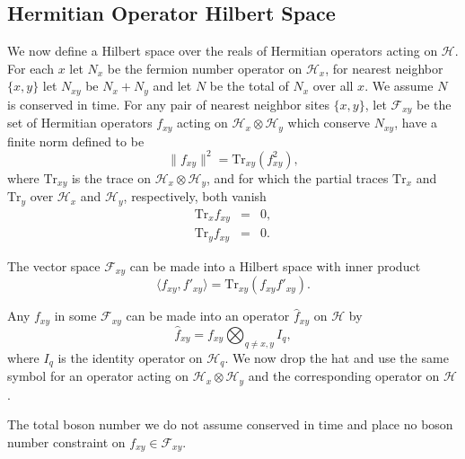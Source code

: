 \documentclass[twocolumn,amsmath,amssymb]{revtex4-1}
\begin{document}
\subsection{\label{subsec:operatorspace} Hermitian Operator Hilbert Space}

We now define a Hilbert space over the reals of Hermitian operators
acting on $\mathcal{H}$. 
For each $x$ let $N_x$ be the fermion number operator on $\mathcal{H}_x$,
for nearest neighbor $\{x, y\}$
let $N_{xy}$ be $N_x + N_y$ and 
let $N$ be the total of $N_x$ over all $x$. 
We assume $N$ is conserved in time.
For any pair of nearest neighbor sites $ \{x, y\}$, let
$\mathcal{F}_{x y}$ be the set of Hermitian operators
$f_{xy}$ acting on
$\mathcal{H}_x \otimes \mathcal{H}_y$  which
conserve $N_{xy}$, have a finite
norm defined to be
\begin{equation}
  \label{normf}
  \parallel f_{xy} \parallel ^ 2 = \mathrm{Tr}_{xy}( f_{xy}^2),
\end{equation}
where $\mathrm{Tr}_{xy}$ is the trace on $\mathcal{H}_x \otimes \mathcal{H}_y$,
and for which the partial traces $\mathrm{Tr}_x$ and $\mathrm{Tr}_y$ over $\mathcal{H}_x$
and $\mathcal{H}_y$, respectively, both vanish
\begin{subequations}
\begin{eqnarray}
  \label{trx}
  \mathrm{Tr}_x f_{xy} & = & 0, \\
  \label{try}
  \mathrm{Tr}_y f_{xy} & = & 0.
\end{eqnarray}
\end{subequations}

The vector space $\mathcal{F}_{x y}$ can be made into a Hilbert space
with inner product
\begin{equation}
  \label{ffprime}
   \langle  f_{xy}, f'_{xy} \rangle  = \mathrm{Tr}_{xy}( f_{xy} f'_{xy}).
\end{equation}

Any $f_{xy}$ in some $\mathcal{F}_{xy}$ can be made into an
operator $\hat{ f}_{xy}$ on $\mathcal{H}$ by
\begin{equation}
\label{defhf}
\hat{ f}_{xy} =  f_{xy} \bigotimes_{q \ne x,y} I_q, 
\end{equation}
where $I_q$ is the identity operator on $\mathcal{H}_q$.
We now drop the hat and use the same symbol for an operator  
acting on $\mathcal{H}_x \otimes \mathcal{H}_y$
and the corresponding operator on $\mathcal{H}$.

The total boson number we do not assume conserved
in time and place no boson number
constraint on $f_{xy} \in \mathcal{F}_{xy}$. 
\end{document}
